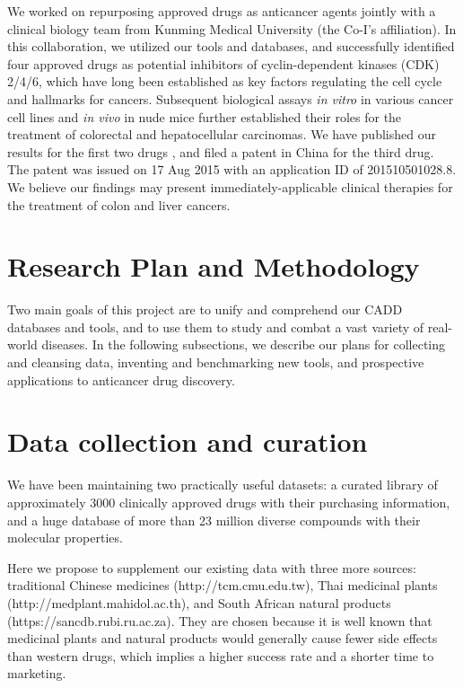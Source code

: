 \documentclass[a4paper,12pt]{article}
\begin{document}
We worked on repurposing approved drugs as anticancer agents jointly with a clinical biology team from Kunming Medical University (the Co-I's affiliation). In this collaboration, we utilized our tools and databases, and successfully identified four approved drugs as potential inhibitors of cyclin-dependent kinases (CDK) 2/4/6, which have long been established as key factors regulating the cell cycle and hallmarks for cancers. Subsequent biological assays \textit{in vitro} in various cancer cell lines and \textit{in vivo} in nude mice further established their roles for the treatment of colorectal \cite{1667} and hepatocellular \cite{1681} carcinomas. We have published our results for the first two drugs \cite{1667,1681}, and filed a patent in China for the third drug. The patent was issued on 17 Aug 2015 with an application ID of 201510501028.8. We believe our findings may present immediately-applicable clinical therapies for the treatment of colon and liver cancers.

\section*{Research Plan and Methodology}

Two main goals of this project are to unify and comprehend our CADD databases and tools, and to use them to study and combat a vast variety of real-world diseases. In the following subsections, we describe our plans for collecting and cleansing data, inventing and benchmarking new tools, and prospective applications to anticancer drug discovery.

\section*{Data collection and curation}

We have been maintaining two practically useful datasets: a curated library of approximately 3000 clinically approved drugs with their purchasing information, and a huge database of more than 23 million diverse compounds with their molecular properties.

Here we propose to supplement our existing data with three more sources: traditional Chinese medicines \cite{528} (http://tcm.cmu.edu.tw), Thai medicinal plants (http://medplant.mahidol.ac.th), and South African natural products \cite{1680} (https://sancdb.rubi.ru.ac.za). They are chosen because it is well known that medicinal plants and natural products would generally cause fewer side effects than western drugs, which implies a higher success rate and a shorter time to marketing.
\end{document}
